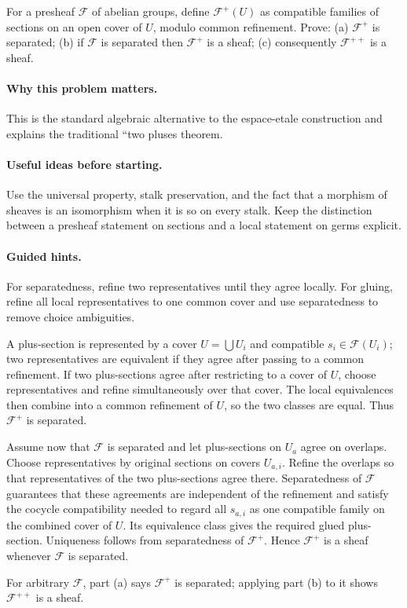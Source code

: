 \begin{problem}
For a presheaf $\mathcal F$ of abelian groups, define $\mathcal F^+(U)$ as compatible families of sections on an open cover of $U$, modulo common refinement. Prove: (a) $\mathcal F^+$ is separated; (b) if $\mathcal F$ is separated then $\mathcal F^+$ is a sheaf; (c) consequently $\mathcal F^{++}$ is a sheaf.
\end{problem}

\paragraph{Why this problem matters.}
This is the standard algebraic alternative to the espace-etale construction and explains the traditional ``two pluses theorem.

\paragraph{Useful ideas before starting.}
Use the universal property, stalk preservation, and the fact that a morphism of sheaves is an isomorphism when it is so on every stalk.  Keep the distinction between a presheaf statement on sections and a local statement on germs explicit.

\paragraph{Guided hints.}
For separatedness, refine two representatives until they agree locally. For gluing, refine all local representatives to one common cover and use separatedness to remove choice ambiguities.

\ifdefined\FullProblemDossiers
\begin{solution}
A plus-section is represented by a cover $U=\bigcup U_i$ and compatible $s_i\in\mathcal F(U_i)$; two representatives are equivalent if they agree after passing to a common refinement. If two plus-sections agree after restricting to a cover of $U$, choose representatives and refine simultaneously over that cover. The local equivalences then combine into a common refinement of $U$, so the two classes are equal. Thus $\mathcal F^+$ is separated.

Assume now that $\mathcal F$ is separated and let plus-sections on $U_a$ agree on overlaps. Choose representatives by original sections on covers $U_{a,i}$. Refine the overlaps so that representatives of the two plus-sections agree there. Separatedness of $\mathcal F$ guarantees that these agreements are independent of the refinement and satisfy the cocycle compatibility needed to regard all $s_{a,i}$ as one compatible family on the combined cover of $U$. Its equivalence class gives the required glued plus-section. Uniqueness follows from separatedness of $\mathcal F^+$. Hence $\mathcal F^+$ is a sheaf whenever $\mathcal F$ is separated.

For arbitrary $\mathcal F$, part (a) says $\mathcal F^+$ is separated; applying part (b) to it shows $\mathcal F^{++}$ is a sheaf.
\end{solution}

